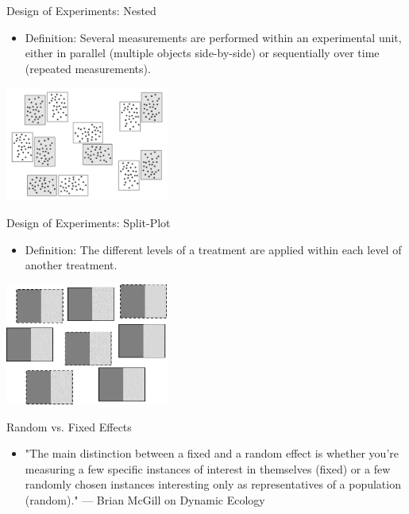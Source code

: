 \documentclass{beamer}
\begin{document}
\begin{frame}{Design of Experiments: Nested}
  \begin{itemize}
    \item Definition: Several measurements are performed within an experimental unit, either in parallel (multiple objects side-by-side) or sequentially over time (repeated measurements).
  \end{itemize}
  \begin{center}
    \includegraphics[width=0.4\textwidth]{lectures/day_1_intro_to_mems/figures/nesteddesign.png}
  \end{center}
\end{frame}

\begin{frame}{Design of Experiments: Split-Plot}
  \begin{itemize}
    \item Definition: The different levels of a treatment are applied within each level of another treatment.
  \end{itemize}
  \begin{center}
    \includegraphics[width=0.4\textwidth]{lectures/day_1_intro_to_mems/figures/splitplot.png}
  \end{center}
\end{frame}

\begin{frame}{Random vs. Fixed Effects}
  \begin{itemize}
    \item "The main distinction between a fixed and a random effect is whether you're measuring a few specific instances of interest in themselves (fixed) or a few randomly chosen instances interesting only as representatives of a population (random)." — Brian McGill on Dynamic Ecology
  \end{itemize}
\end{frame}
\end{document}
